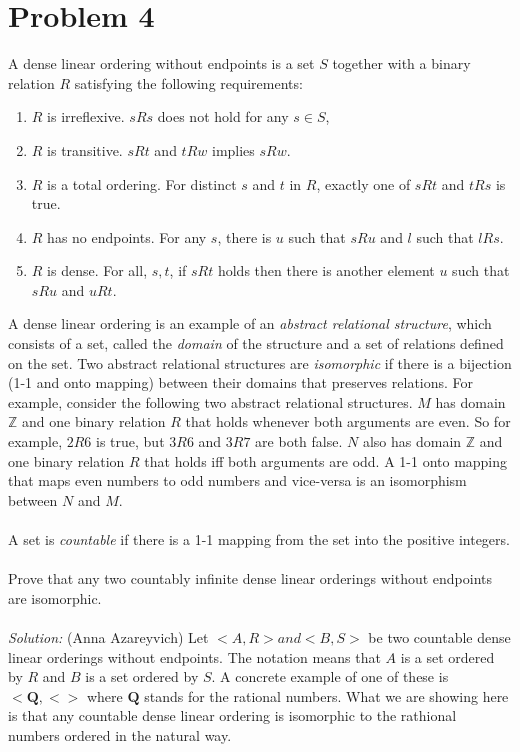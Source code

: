 \documentclass[11pt,a4paper]{report}
\theoremstyle{plain}
\theoremstyle{definition}
\theoremstyle{remark}
\begin{document}
	\section*{Problem 4}
	A dense linear ordering without endpoints is a set $S$ together with a binary relation $R$ satisfying the following requirements:
	\begin{enumerate}
		\item $R$ is irreflexive.  $sRs$ does not hold for any $s \in S$, 
		\item $R$ is transitive.  $sRt$ and $tRw$ implies $sRw$.
		\item $R$ is a total ordering.  For distinct $s$ and $t$ in $R$, exactly one of $sRt$ and $tRs$ is true.
		\item $R$ has no endpoints.  For any $s$, there is $u$ such that $sRu$ and $l$ such that $lRs$.
		\item $R$ is dense.  For all, $s,t$, if $sRt$ holds then there is another element $u$ such that $sRu$ and $uRt$.
	\end{enumerate}
   A dense linear ordering is an example of an \emph{abstract relational structure}, which consists of a set, called the \emph{domain} of the structure and a set of relations defined on the set.  Two abstract relational structures are \emph{isomorphic} if there is a bijection (1-1 and onto mapping) between their domains that preserves relations.  For example, consider the following two abstract relational structures.
   $M$ has domain $\mathbb{Z}$ and one binary relation $R$ that holds whenever both arguments are even.  So for example, $2R6$ is true, but $3R6$ and $3R7$ are both false.  $N$ also has domain $\mathbb{Z}$ and one binary relation $R$ that holds iff both arguments are odd.
  A 1-1 onto mapping that maps even numbers to odd numbers and vice-versa is an isomorphism between $N$ and $M$.
  \\\\
  A set is \emph{countable} if there is a 1-1 mapping from the set into the positive integers.
  \\\\
  Prove that any two countably infinite dense linear orderings without endpoints are isomorphic.
  \\\\
  \emph{Solution:} (Anna Azareyvich) 
  Let $<A, R> and <B, S>$ be two countable dense linear orderings without endpoints.  The notation means that $A$ is a set ordered by $R$ and $B$ is a set ordered by $S$.  A concrete example of one of these is $<\mathbf{Q}, <>$ where $\mathbf{Q}$ stands for the rational numbers.  What we are showing here is that any countable dense linear ordering is isomorphic to the rathional numbers ordered in the natural way.
\end{document}

